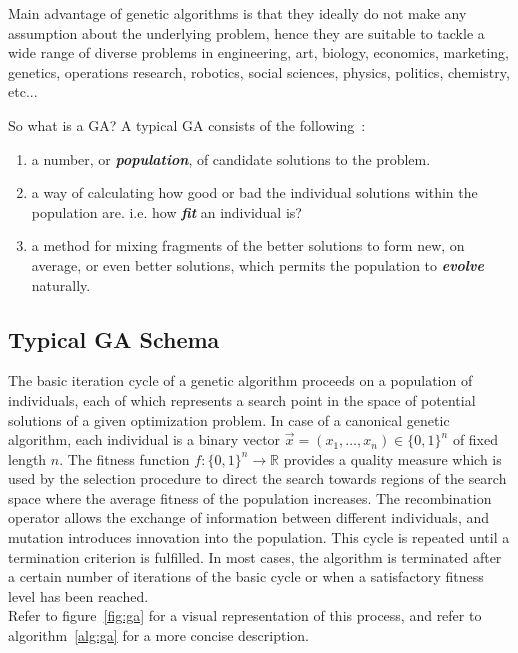 \documentclass[12pt]{article}
\newcommand{\textem}[1]{\textbf{\emph{#1}}}
\begin{document}
Main advantage of genetic algorithms is that they ideally do not make
any assumption about the underlying problem, hence they are suitable to tackle
a wide range of diverse problems in
engineering, art, biology, economics, marketing, genetics,
operations research, robotics, social sciences, physics, politics, chemistry,
etc... \cite[ch.~6]{coley}

\noindent
So what is a GA? A typical GA consists of the following~\cite[ch.~1]{coley}:
\vspace{-5mm}
\begin{enumerate}
\setlength{\parskip}{0em}

\item
a number, or \textem{population}, of candidate solutions to the problem.

\item
a way of calculating how good or bad the individual solutions within the
population are.
i.e. how \textem{fit} an individual is?

\item
a method for mixing fragments of the better solutions to form new, on
average, or even better solutions,
which permits the population to \textem{evolve} naturally.

\end{enumerate}

\subsection{Typical GA Schema}
The basic iteration cycle of a genetic algorithm proceeds on a population
of individuals, each of which represents a search point in the space
of potential solutions of a given optimization problem.
In case of a canonical genetic algorithm, each individual is a binary vector
$ \vec{x} = ( x_1, \dots, x_n ) \in \{0, 1\}^n $
of fixed length $n$.
The fitness function
$ f: \{0, 1\}^n \rightarrow \mathbb{R} $
provides a quality measure which is used by the selection procedure to direct
the search towards regions of the search space where the
average fitness of the population increases.
The recombination operator
allows the exchange of information between different individuals,
and mutation introduces innovation into the population.
This cycle is repeated until a termination criterion is fulfilled.
In most cases, the algorithm is terminated after a certain number of
iterations of the basic cycle or when a satisfactory fitness
level has been reached.\\
Refer to figure~\ref{fig:ga} for a visual representation of this process,
and refer to algorithm~\ref{alg:ga} for a more concise description.
\end{document}
